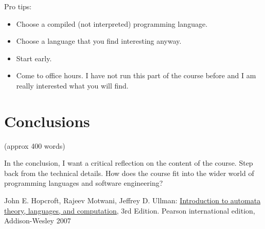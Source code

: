 \documentclass{article}
\theoremstyle{theorem}
\theoremstyle{definition}
\theoremstyle{remark}
\begin{document}
\medskip\noindent
Pro tips:
\begin{itemize}
\item Choose a compiled (not interpreted) programming language.
\item Choose a language that you find interesting anyway.
\item Start early.
\item Come to office hours. I have not run this part of the course before and I am really interested what you will find.
\end{itemize}
 
\section{Conclusions}\label{conclusions}

(approx 400 words)

In the conclusion, I want a critical reflection on the content of the course. Step back from the technical details. How does the course fit into the wider world of programming languages and software engineering?

\begin{thebibliography}{99}
	John E. Hopcroft, Rajeev Motwani, Jeffrey D. Ullman:
\href{http://ce.sharif.edu/courses/94-95/1/ce414-2/resources/root/Text%20Books/Automata/John%20E.%20Hopcroft,%20Rajeev%20Motwani,%20Jeffrey%20D.%20Ullman-Introduction%20to%20Automata%20Theory,%20Languages,%20and%20Computations-Prentice%20Hall%20(2006).pdf}{Introduction to automata theory, languages, and computation,} 3rd Edition. Pearson international edition, Addison-Wesley 2007

\end{thebibliography}
\end{document}
